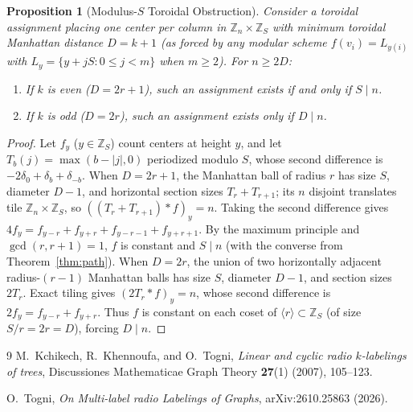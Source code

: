 \documentclass[11pt]{article}
\newtheorem{proposition}[theorem]{Proposition}
\begin{document}
\begin{proposition}[Modulus-$S$ Toroidal Obstruction]
Consider a toroidal assignment placing one center per column in $\mathbb{Z}_n \times \mathbb{Z}_S$ with minimum toroidal Manhattan distance $D = k + 1$ (as forced by any modular scheme $f(v_i) = L_{y(i)}$ with $L_y = \{y + jS : 0 \le j < m\}$ when $m \ge 2$). For $n \ge 2D$:
\begin{enumerate}
\item If $k$ is even ($D = 2r + 1$), such an assignment exists if and only if $S \mid n$.
\item If $k$ is odd ($D = 2r$), such an assignment exists only if $D \mid n$.
\end{enumerate}
\end{proposition}

\begin{proof}
Let $f_y$ ($y \in \mathbb{Z}_S$) count centers at height $y$, and let $T_b(j) = \max(b - |j|, 0)$ periodized modulo $S$, whose second difference is $-2\delta_0 + \delta_b + \delta_{-b}$.
When $D = 2r + 1$, the Manhattan ball of radius $r$ has size $S$, diameter $D - 1$, and horizontal section sizes $T_r + T_{r+1}$; its $n$ disjoint translates tile $\mathbb{Z}_n \times \mathbb{Z}_S$, so $((T_r + T_{r+1}) * f)_y = n$. Taking the second difference gives $4f_y = f_{y-r} + f_{y+r} + f_{y-r-1} + f_{y+r+1}$. By the maximum principle and $\gcd(r, r+1) = 1$, $f$ is constant and $S \mid n$ (with the converse from Theorem~\ref{thm:path}).
When $D = 2r$, the union of two horizontally adjacent radius-$(r-1)$ Manhattan balls has size $S$, diameter $D - 1$, and section sizes $2T_r$. Exact tiling gives $(2T_r * f)_y = n$, whose second difference is $2f_y = f_{y-r} + f_{y+r}$. Thus $f$ is constant on each coset of $\langle r \rangle \subset \mathbb{Z}_S$ (of size $S/r = 2r = D$), forcing $D \mid n$.
\end{proof}

\begin{thebibliography}{9}
M.~Kchikech, R.~Khennoufa, and O.~Togni,
\emph{Linear and cyclic radio $k$-labelings of trees},
Discussiones Mathematicae Graph Theory \textbf{27}(1) (2007), 105--123.

O.~Togni,
\emph{On Multi-label radio Labelings of Graphs},
arXiv:2610.25863 (2026).
\end{thebibliography}
\end{document}
